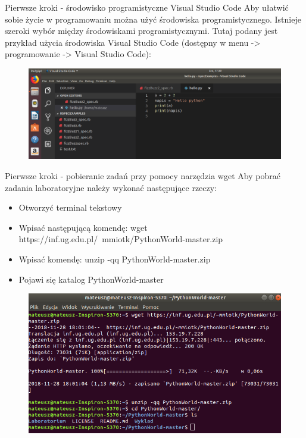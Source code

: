 \documentclass[10pt,ignorenonframetext,]{beamer}
\begin{document}
\begin{frame}{Pierwsze kroki - środowisko programistyczne Visual Studio Code}
  Aby ułatwić sobie życie w programowaniu można użyć środowiska programistycznego. Istnieje szeroki wybór między środowiskami programistycznymi. 
  Tutaj podany jest przykład użycia środowiska Visual Studio Code (dostępny w menu -> programowanie -> Visual Studio Code): 
      \begin{figure}[!h]
  	\centering
  	\includegraphics[scale=0.25]{pictures/visual.png}
  \end{figure}
\end{frame}

\begin{frame}{Pierwsze kroki - pobieranie zadań przy pomocy narzędzia wget}
  Aby pobrać zadania laboratoryjne należy wykonać następujące rzeczy: 
  \begin{itemize}
  	\item Otworzyć terminal tekstowy
  	\item Wpisać następującą komendę: wget https://inf.ug.edu.pl/~mmiotk/PythonWorld-master.zip
  	\item Wpisać komendę: unzip -qq PythonWorld-master.zip
  	\item Pojawi się katalog PythonWorld-master
  \end{itemize}
      \begin{figure}[!h]
	\centering
	\includegraphics[scale=0.3]{pictures/pobieranie.png}
\end{figure}
\end{frame}
\end{document}
